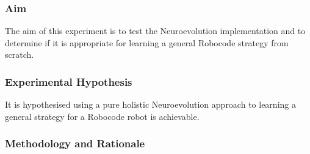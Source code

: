\subsubsection{Aim}
The aim of this experiment is to test the Neuroevolution implementation and to determine if it is appropriate for learning a general Robocode strategy from scratch.

\subsubsection{Experimental Hypothesis}
It is hypothesised using a pure holistic Neuroevolution approach to learning a general strategy for a Robocode robot is achievable.

\subsubsection{Methodology and Rationale}


